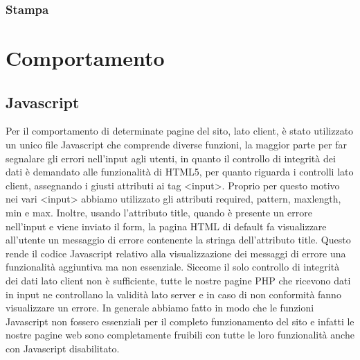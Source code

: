 \documentclass[a4paper]{article}
\begin{document}
    \subsubsection{Stampa}

    \section{Comportamento}

    \subsection{Javascript}
    Per il comportamento di determinate pagine del sito, lato client, è stato utilizzato un unico file Javascript che comprende diverse funzioni, la maggior parte per far segnalare gli errori nell’input agli utenti, in quanto il controllo di integrità dei dati è demandato alle funzionalità di HTML5, per quanto riguarda i controlli lato client, assegnando i giusti attributi ai tag <input>. Proprio per questo motivo nei vari <input> abbiamo utilizzato gli attributi required, pattern, maxlength, min e max. Inoltre, usando l'attributo title, quando è presente un errore nell’input e viene inviato il form, la pagina HTML di default fa visualizzare all’utente un messaggio di errore contenente la stringa dell’attributo title. Questo rende il codice Javascript relativo alla visualizzazione dei messaggi di errore una funzionalità aggiuntiva ma non essenziale. Siccome il solo controllo di integrità dei dati lato client non è sufficiente, tutte le nostre pagine PHP che ricevono dati in input ne controllano la validità lato server e in caso di non conformità fanno visualizzare un errore.  In generale abbiamo fatto in modo che le funzioni Javascript non fossero essenziali per il completo funzionamento del sito e  infatti le nostre pagine web sono completamente fruibili con tutte le loro funzionalità anche con Javascript disabilitato.
\end{document}
